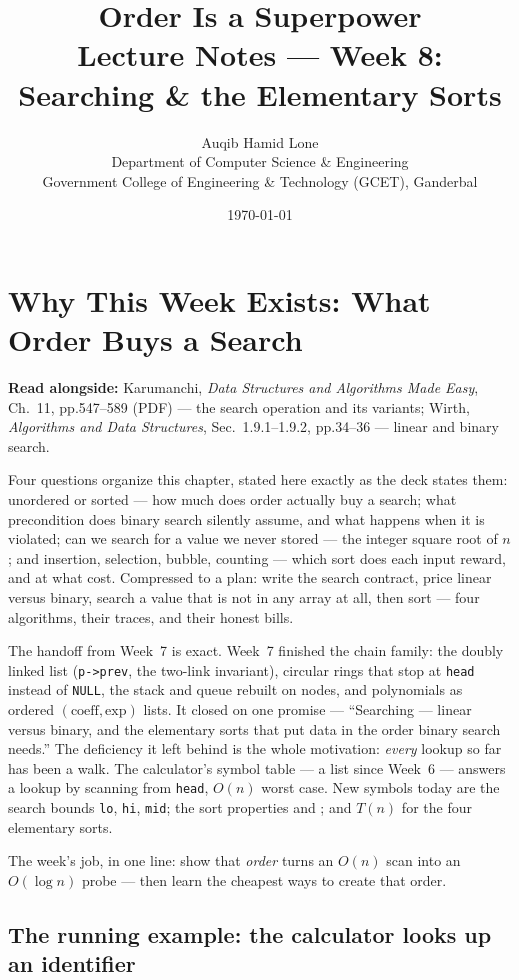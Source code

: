 \documentclass[11pt]{article}
\title{Order Is a Superpower\\\large Lecture Notes --- Week 8: Searching \& the Elementary Sorts}
\author{Auqib Hamid Lone\\[0.3em]
  \small Department of Computer Science \& Engineering\\
  \small Government College of Engineering \& Technology (GCET), Ganderbal}
\date{\today}
\begin{document}
\maketitle

\section{Why This Week Exists: What Order Buys a Search}

\textbf{Read alongside:} Karumanchi, \textit{Data Structures and Algorithms Made Easy}, Ch.~11, pp.547--589 (PDF) --- the search operation and its variants; Wirth, \textit{Algorithms and Data Structures}, Sec.~1.9.1--1.9.2, pp.34--36 --- linear and binary search.

Four questions organize this chapter, stated here exactly as the deck states them: unordered or sorted --- how much does order actually buy a search; what precondition does binary search silently assume, and what happens when it is violated; can we search for a value we never stored --- the integer square root of $n$; and insertion, selection, bubble, counting --- which sort does each input reward, and at what cost. Compressed to a plan: write the search contract, price linear versus binary, search a value that is not in any array at all, then sort --- four algorithms, their traces, and their honest bills.

The handoff from Week~7 is exact. Week~7 finished the chain family: the doubly linked list (\texttt{p->prev}, the two-link invariant), circular rings that stop at \texttt{head} instead of \texttt{NULL}, the stack and queue rebuilt on nodes, and polynomials as ordered $(\text{coeff},\text{exp})$ lists. It closed on one promise --- ``Searching --- linear versus binary, and the elementary sorts that put data in the order binary search needs.'' The deficiency it left behind is the whole motivation: \emph{every} lookup so far has been a walk. The calculator's symbol table --- a list since Week~6 --- answers a lookup by scanning from \texttt{head}, $O(n)$ worst case. New symbols today are the search bounds \texttt{lo}, \texttt{hi}, \texttt{mid}; the sort properties  and ; and $T(n)$ for the four elementary sorts.

The week's job, in one line: show that \emph{order} turns an $O(n)$ scan into an $O(\log n)$ probe --- then learn the cheapest ways to create that order.

\subsection*{The running example: the calculator looks up an identifier}
\end{document}
